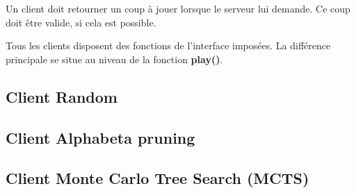 Un client doit retourner un coup à jouer lorsque le serveur lui demande.
Ce coup doit être valide, si cela est possible.

Tous les clients disposent des fonctions de l'interface imposées.
La différence principale se situe au niveau de la fonction \textbf{play()}.

\subsection{Client Random}

\subsection{Client Alphabeta pruning}

\subsection{Client Monte Carlo Tree Search (MCTS)}
